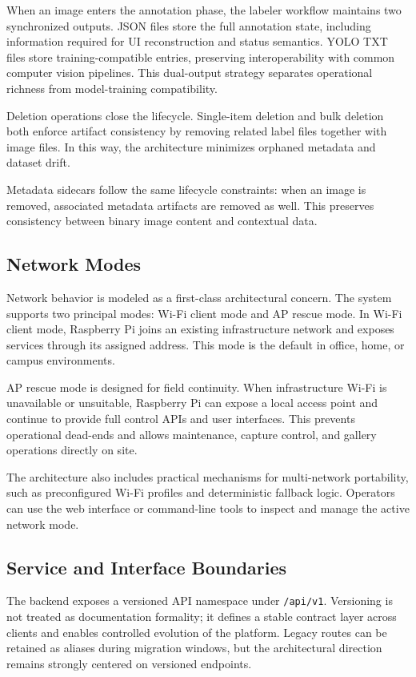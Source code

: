 When an image enters the annotation phase, the labeler workflow maintains two synchronized outputs. JSON files store the full annotation state, including information required for UI reconstruction and status semantics. YOLO TXT files store training-compatible entries, preserving interoperability with common computer vision pipelines. This dual-output strategy separates operational richness from model-training compatibility.

Deletion operations close the lifecycle. Single-item deletion and bulk deletion both enforce artifact consistency by removing related label files together with image files. In this way, the architecture minimizes orphaned metadata and dataset drift.

Metadata sidecars follow the same lifecycle constraints: when an image is removed, associated metadata artifacts are removed as well. This preserves consistency between binary image content and contextual data.

\subsection{Network Modes}
Network behavior is modeled as a first-class architectural concern. The system supports two principal modes: Wi-Fi client mode and AP rescue mode. In Wi-Fi client mode, Raspberry Pi joins an existing infrastructure network and exposes services through its assigned address. This mode is the default in office, home, or campus environments.

AP rescue mode is designed for field continuity. When infrastructure Wi-Fi is unavailable or unsuitable, Raspberry Pi can expose a local access point and continue to provide full control APIs and user interfaces. This prevents operational dead-ends and allows maintenance, capture control, and gallery operations directly on site.

The architecture also includes practical mechanisms for multi-network portability, such as preconfigured Wi-Fi profiles and deterministic fallback logic. Operators can use the web interface or command-line tools to inspect and manage the active network mode.

\subsection{Service and Interface Boundaries}
The backend exposes a versioned API namespace under \texttt{/api/v1}. Versioning is not treated as documentation formality; it defines a stable contract layer across clients and enables controlled evolution of the platform. Legacy routes can be retained as aliases during migration windows, but the architectural direction remains strongly centered on versioned endpoints.


